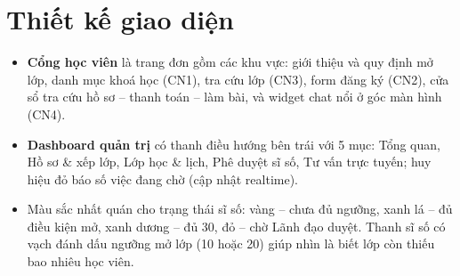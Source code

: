\section{Thiết kế giao diện}
\begin{itemize}
  \item \textbf{Cổng học viên} là trang đơn gồm các khu vực: giới thiệu và quy định mở lớp, danh mục khoá học (CN1), tra cứu lớp (CN3), form đăng ký (CN2), cửa sổ tra cứu hồ sơ – thanh toán – làm bài, và widget chat nổi ở góc màn hình (CN4).
  \item \textbf{Dashboard quản trị} có thanh điều hướng bên trái với 5 mục: Tổng quan, Hồ sơ \& xếp lớp, Lớp học \& lịch, Phê duyệt sĩ số, Tư vấn trực tuyến; huy hiệu đỏ báo số việc đang chờ (cập nhật realtime).
  \item Màu sắc nhất quán cho trạng thái sĩ số: vàng – chưa đủ ngưỡng, xanh lá – đủ điều kiện mở, xanh dương – đủ 30, đỏ – chờ Lãnh đạo duyệt. Thanh sĩ số có vạch đánh dấu ngưỡng mở lớp (10 hoặc 20) giúp nhìn là biết lớp còn thiếu bao nhiêu học viên.
\end{itemize}
